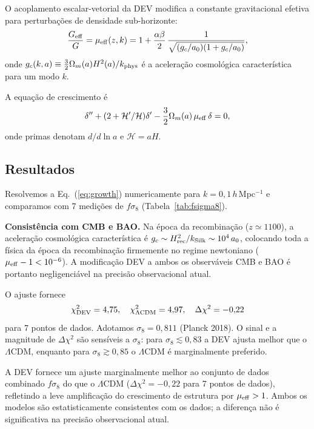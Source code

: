 \documentclass[aps,prd,twocolumn,showpacs,superscriptaddress]{revtex4-2}
\newcommand{\aO}{a_0}
\newcommand{\mueff}{\mu_{\rm eff}}
\newcommand{\LCDM}{$\Lambda$CDM}
\begin{document}
O acoplamento escalar-vetorial da DEV modifica a constante
gravitacional efetiva para perturbações de densidade sub-horizonte:
\begin{equation}
  \frac{G_{\rm eff}}{G}
  = \mueff(z,k)
  = 1 + \frac{\alpha\beta}{2}\,
    \frac{1}{\sqrt{(g_c/\aO)(1+g_c/\aO)}},
  \label{eq:mueff}
\end{equation}
onde $g_c(k,a) \equiv \frac{3}{2}\Omega_m(a)H^2(a)/k_{\rm phys}$
é a aceleração cosmológica característica para um modo $k$.

A equação de crescimento é
\begin{equation}
  \delta'' + (2+\mathcal{H}'/\mathcal{H})\delta'
  - \frac{3}{2}\Omega_m(a)\,\mueff\,\delta = 0,
  \label{eq:growth}
\end{equation}
onde primas denotam $d/d\ln a$ e $\mathcal{H} = aH$.

\subsection{Resultados}

Resolvemos a Eq.~(\ref{eq:growth}) numericamente para
$k = 0{,}1\,h\,$Mpc$^{-1}$ e comparamos com 7 medições de $f\sigma_8$
(Tabela~\ref{tab:fsigma8}).

\textbf{Consistência com CMB e BAO.}
Na época da recombinação ($z \simeq 1100$), a aceleração
cosmológica característica é $g_c \sim H_{\rm rec}^2/k_{\rm Silk}
\sim 10^4\,\aO$, colocando toda a física da época da recombinação
firmemente no regime newtoniano ($\mueff - 1 < 10^{-6}$).
A modificação DEV a ambos os observáveis CMB e BAO é portanto
negligenciável na precisão observacional atual.

O ajuste fornece
\begin{equation}
  \chi^2_{\rm DEV} = 4{,}75, \quad
  \chi^2_{\Lambda{\rm CDM}} = 4{,}97, \quad
  \Delta\chi^2 = -0{,}22
\end{equation}
para 7 pontos de dados.
Adotamos $\sigma_8 = 0{,}811$ (Planck 2018).
O sinal e a magnitude de $\Delta\chi^2$ são sensíveis a $\sigma_8$:
para $\sigma_8 \lesssim 0{,}83$ a DEV ajusta melhor que o \LCDM{},
enquanto para $\sigma_8 \gtrsim 0{,}85$ o \LCDM{} é marginalmente
preferido.

A DEV fornece um ajuste marginalmente melhor ao conjunto de dados
combinado $f\sigma_8$ do que o \LCDM{} ($\Delta\chi^2 = -0{,}22$
para 7 pontos de dados), refletindo a leve amplificação do
crescimento de estrutura por $\mueff > 1$.
Ambos os modelos são estatisticamente consistentes com os dados;
a diferença não é significativa na precisão observacional atual.
\end{document}
